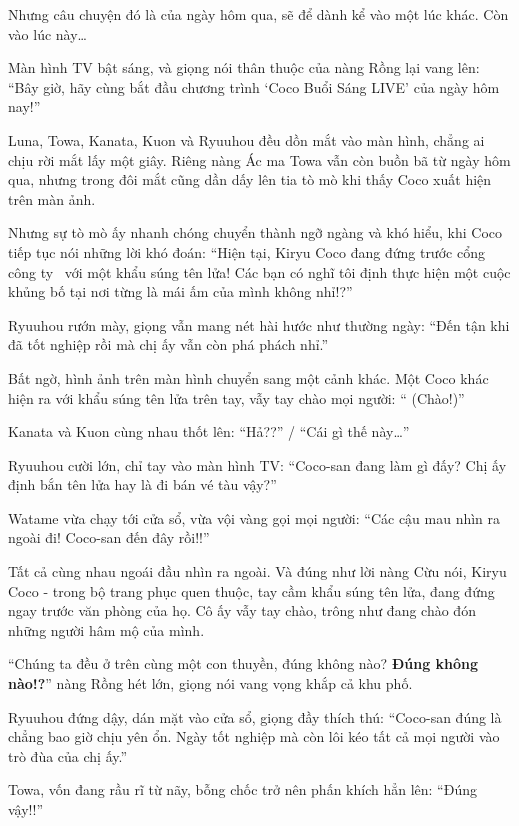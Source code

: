 \documentclass[../main.tex]{subfiles}
\begin{document}
Nhưng câu chuyện đó là của ngày hôm qua, sẽ để dành kể vào một lúc khác. Còn vào lúc này\dots

Màn hình TV bật sáng, và giọng nói thân thuộc của nàng Rồng lại vang lên: ``Bây giờ, hãy cùng bắt đầu chương trình `Coco Buổi Sáng LIVE' của ngày hôm nay!''

Luna, Towa, Kanata, Kuon và Ryuuhou đều dồn mắt vào màn hình, chẳng ai chịu rời mắt lấy một giây. Riêng nàng Ác ma Towa vẫn còn buồn bã từ ngày hôm qua, nhưng trong đôi mắt cũng dần dấy lên tia tò mò khi thấy Coco xuất hiện trên màn ảnh.


Nhưng sự tò mò ấy nhanh chóng chuyển thành ngỡ ngàng và khó hiểu, khi Coco tiếp tục nói những lời khó đoán: ``Hiện tại, Kiryu Coco đang đứng trước cổng công ty \hll\ với một khẩu súng tên lửa! Các bạn có nghĩ tôi định thực hiện một cuộc khủng bố tại nơi từng là mái ấm của mình không nhỉ!?''

Ryuuhou rướn mày, giọng vẫn mang nét hài hước như thường ngày: ``Đến tận khi đã tốt nghiệp rồi mà chị ấy vẫn còn phá phách nhỉ.''

Bất ngờ, hình ảnh trên màn hình chuyển sang một cảnh khác. Một Coco khác hiện ra với khẩu súng tên lửa trên tay, vẫy tay chào mọi người: `` (Chào!)''


Kanata và Kuon cùng nhau thốt lên: ``Hả??'' / ``Cái gì thế này\dots''

Ryuuhou cười lớn, chỉ tay vào màn hình TV: ``Coco-san đang làm gì đấy? Chị ấy định bắn tên lửa hay là đi bán vé tàu vậy?''

Watame vừa chạy tới cửa sổ, vừa vội vàng gọi mọi người: ``Các cậu mau nhìn ra ngoài đi! Coco-san đến đây rồi!!''

Tất cả cùng nhau ngoái đầu nhìn ra ngoài. Và đúng như lời nàng Cừu nói, Kiryu Coco - trong bộ trang phục quen thuộc, tay cầm khẩu súng tên lửa, đang đứng ngay trước văn phòng của họ. Cô ấy vẫy tay chào, trông như đang chào đón những người hâm mộ của mình.

``Chúng ta đều ở trên cùng một con thuyền, đúng không nào? \textbf{Đúng không nào!?}'' nàng Rồng hét lớn, giọng nói vang vọng khắp cả khu phố.

Ryuuhou đứng dậy, dán mặt vào cửa sổ, giọng đầy thích thú: ``Coco-san đúng là chẳng bao giờ chịu yên ổn. Ngày tốt nghiệp mà còn lôi kéo tất cả mọi người vào trò đùa của chị ấy.''

Towa, vốn đang rầu rĩ từ nãy, bỗng chốc trở nên phấn khích hẳn lên: ``Đúng vậy!!''
\end{document}
